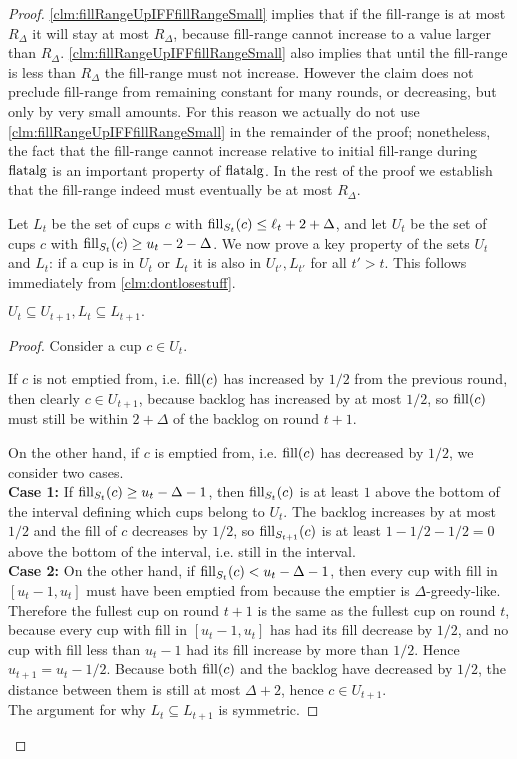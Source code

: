 \begin{proof}
  \cref{clm:fillRangeUpIFFfillRangeSmall} implies that if the
  fill-range is at most $R_\Delta$ it will stay at most
  $R_\Delta$, because fill-range cannot increase to a value
  larger than $R_\Delta$. \cref{clm:fillRangeUpIFFfillRangeSmall}
  also implies that until the fill-range is less than $R_\Delta$
  the fill-range must not increase. However the claim does not
  preclude fill-range from remaining constant for many rounds, or
  decreasing, but only by very small amounts. For this reason we
  actually do not use \cref{clm:fillRangeUpIFFfillRangeSmall} in
  the remainder of the proof; nonetheless, the fact that the
  fill-range cannot increase relative to initial fill-range
  during $\operatorname{\text{\textup{flatalg}}}$ is an important property of $\operatorname{\text{\textup{flatalg}}}$. In
  the rest of the proof we establish that the fill-range indeed
  must eventually be at most $R_\Delta$.

  Let $L_t$ be the set of cups $c$ with $\operatorname{\text{\textup{fill}}}_{S_t}(c) \le \ell_t+2+\Delta$, and let
  $U_t$ be the set of cups $c$ with $\operatorname{\text{\textup{fill}}}_{S_t}(c) \ge u_t-2-\Delta$.
  We now prove a key property of the sets $U_t$ and $L_t$: if a cup is in
  $U_t$ or $L_t$ it is also in $U_{t'}, L_{t'}$ for all $t' > t$. This
  follows immediately from \cref{clm:dontlosestuff}.
  \begin{clm}
    \label{clm:dontlosestuff}
    $U_{t} \subseteq U_{t+1}, L_t \subseteq L_{t+1}.$
  \end{clm}
  \begin{proof}
    Consider a cup $c\in U_t$.

    If $c$ is not emptied from, i.e. $\operatorname{\text{\textup{fill}}}(c)$ has increased by
    $1/2$ from the previous round, then
    clearly $c \in U_{t+1}$, because backlog has increased by at most $1/2$, so
    $\operatorname{\text{\textup{fill}}}(c)$ must still be within $2+\Delta$ of the backlog on round $t+1$. 

    On the other hand, if $c$ is emptied from, i.e. $\operatorname{\text{\textup{fill}}}(c)$ has decreased by
    $1/2$, we consider two cases.\\
    \textbf{Case 1:} If $\operatorname{\text{\textup{fill}}}_{S_t}(c) \ge u_t-\Delta -1$, then
    $\operatorname{\text{\textup{fill}}}_{S_t}(c)$ is at least $1$ above the bottom of the
    interval defining which cups belong to $U_t$. The backlog
    increases by at most $1/2$ and the fill of $c$ decreases by $1/2$, so
    $\operatorname{\text{\textup{fill}}}_{S_{t+1}}(c)$ is at least $1-1/2-1/2 = 0$ above the bottom of the
    interval, i.e. still in the interval. \\
    \textbf{Case 2:} On the other hand, if $\operatorname{\text{\textup{fill}}}_{S_t}(c) <
    u_t-\Delta-1$, then every cup with fill in $[u_t-1, u_t]$
    must have been emptied from because the emptier is
    $\Delta$-greedy-like. Therefore the fullest cup
    on round $t+1$ is the same as the fullest cup on round $t$,
    because every cup with fill in $[u_t-1, u_t]$
    has had its fill decrease by $1/2$, and no cup with fill less than
    $u_t-1$ had its fill increase by more than $1/2$. Hence $u_{t+1}
    = u_t -1/2$. Because both $\operatorname{\text{\textup{fill}}}(c)$ and the backlog
    have decreased by $1/2$, the distance between them is
    still at most $\Delta+2$, hence $c\in U_{t+1}$.\\
    The argument for why $L_t \subseteq L_{t+1}$ is symmetric.
  \end{proof}


\end{proof}
